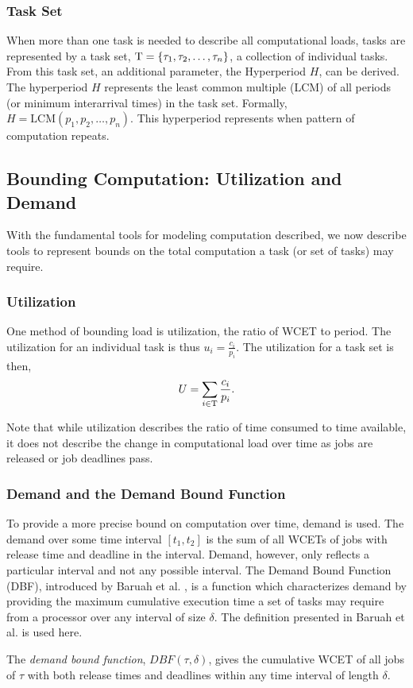 \subsubsection{Task Set}

When more than one task is needed to describe all computational loads, tasks are represented by a task set, $\mathrm{T} = \{\tau_1, \tau_2, \dots, \tau_n\}$, a collection of individual tasks.
From this task set, an additional parameter, the Hyperperiod $H$, can be derived.
The hyperperiod $H$ represents the least common multiple (LCM) of all periods (or minimum interarrival times) in  the task set.
Formally, $H = \text{LCM}(p_1, p_2, \dots, p_n)$.
This hyperperiod represents when pattern of computation repeats.

\subsection{Bounding Computation: Utilization and Demand}

With the fundamental tools for modeling computation described, we now describe tools to represent bounds on the total computation a task (or set of tasks) may require. 

\subsubsection{Utilization}

One method of bounding load is utilization, the ratio of WCET to period.
The utilization for an individual task is thus $u_i = \frac{c_i}{p_i}$.
The utilization for a task set is then,
\begin{equation}
    U = \sum_{i \in \mathrm{T}} \frac{c_i}{p_i}.
\end{equation}

Note that while utilization describes the ratio of time consumed to time available, it does not describe the change in computational load over time as jobs are released or job deadlines pass.

\subsubsection{Demand and the Demand Bound Function}

To provide a more precise bound on computation over time, demand is used.
The demand over some time interval $[t_1,t_2]$ is the sum of all WCETs of jobs with release time and deadline in the interval.
Demand, however, only reflects a particular interval and not any possible interval.
The Demand Bound Function (DBF), introduced by Baruah et al. \cite{baruah_preemptively_1990}, is a function which characterizes demand by providing the maximum cumulative execution time a set of tasks may require from a processor over any interval of size $\delta$.
The definition presented in Baruah et al. \cite{baruah_preemptively_1990} is used here.
\begin{definition}\label{def:dbf}
    The \textit{demand bound function}, $DBF(\tau,\delta)$, gives the cumulative WCET of all jobs of $\tau$ with both release times and deadlines within any time interval of length $\delta$.
\end{definition}

